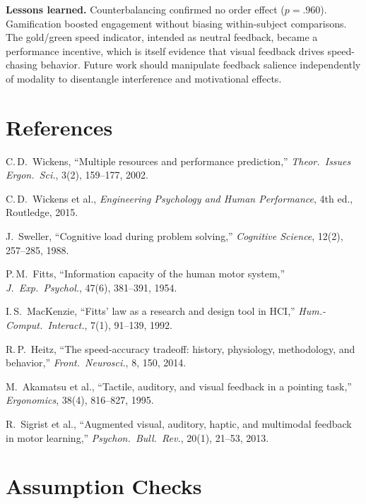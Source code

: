 \documentclass[12pt,letterpaper]{article}
\begin{document}
\textbf{Lessons learned.} Counterbalancing confirmed no order effect ($p = .960$). Gamification boosted engagement without biasing within-subject comparisons. The gold/green speed indicator, intended as neutral feedback, became a performance incentive, which is itself evidence that visual feedback drives speed-chasing behavior. Future work should manipulate feedback salience independently of modality to disentangle interference and motivational effects.


\section*{References}
{\small
\begin{enumerate}[label={[\arabic*]},leftmargin=1.5em,itemsep=2pt]
  \item C.\,D.\ Wickens, ``Multiple resources and performance prediction,'' \emph{Theor.\ Issues Ergon.\ Sci.}, 3(2), 159--177, 2002.
  \item C.\,D.\ Wickens et al., \emph{Engineering Psychology and Human Performance}, 4th ed., Routledge, 2015.
  \item J.\ Sweller, ``Cognitive load during problem solving,'' \emph{Cognitive Science}, 12(2), 257--285, 1988.
  \item P.\,M.\ Fitts, ``Information capacity of the human motor system,'' \emph{J.\ Exp.\ Psychol.}, 47(6), 381--391, 1954.
  \item I.\,S.\ MacKenzie, ``Fitts' law as a research and design tool in HCI,'' \emph{Hum.-Comput.\ Interact.}, 7(1), 91--139, 1992.
  \item R.\,P.\ Heitz, ``The speed-accuracy tradeoff: history, physiology, methodology, and behavior,'' \emph{Front.\ Neurosci.}, 8, 150, 2014.
  \item M.\ Akamatsu et al., ``Tactile, auditory, and visual feedback in a pointing task,'' \emph{Ergonomics}, 38(4), 816--827, 1995.
  \item R.\ Sigrist et al., ``Augmented visual, auditory, haptic, and multimodal feedback in motor learning,'' \emph{Psychon.\ Bull.\ Rev.}, 20(1), 21--53, 2013.
\end{enumerate}
}


\newpage
\appendix

\section{Assumption Checks}
\end{document}
